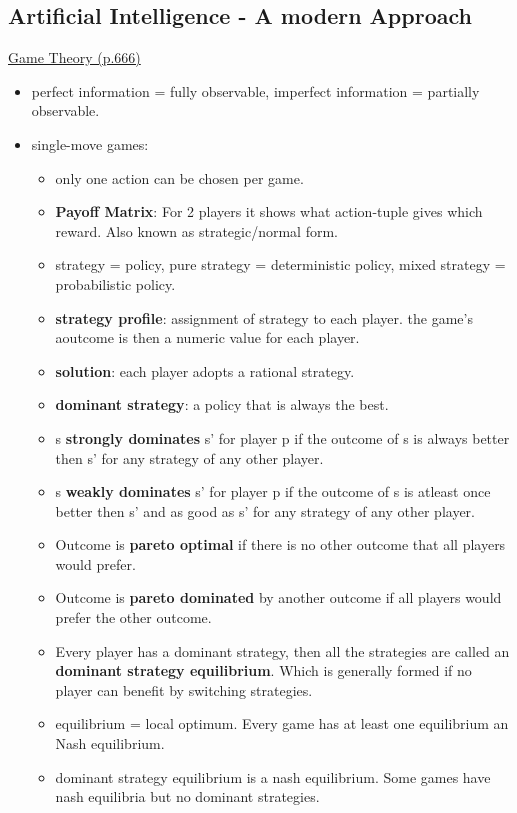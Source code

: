 \subsection{Artificial Intelligence - A modern Approach}
\underline{Game Theory (p.666)}
\begin{itemize}[noitemsep,nolistsep]
	\item perfect information = fully observable, imperfect information = partially observable.
	\item single-move games:
	\begin{itemize}[noitemsep,nolistsep]
		\item only one action can be chosen per game.
		\item \textbf{Payoff Matrix}: For 2 players it shows what action-tuple gives which reward. Also known as strategic/normal form.
		\item strategy = policy, pure strategy = deterministic policy, mixed strategy = probabilistic policy.
		\item \textbf{strategy profile}: assignment of strategy to each player. the game's aoutcome is then a numeric value for each player.
		\item \textbf{solution}: each player adopts a rational strategy.
		\item \textbf{dominant strategy}: a policy that is always the best.
		\item s \textbf{strongly dominates} s' for player p if the outcome of s is always better then s' for any strategy of any other player.
		\item s \textbf{weakly dominates} s' for player p if the outcome of s is atleast once better then s' and as good as s' for any strategy of any other player.
		\item Outcome is \textbf{pareto optimal} if there is no other outcome that all players would prefer.
		\item Outcome is \textbf{pareto dominated} by another outcome if all players would prefer the other outcome.
		\item Every player has a dominant strategy, then all the strategies are called an \textbf{dominant strategy equilibrium}. Which is generally formed if no player can benefit by switching strategies.
		\item equilibrium = local optimum. Every game has at least one equilibrium an Nash equilibrium.
		\item dominant strategy equilibrium is a nash equilibrium. Some games have nash equilibria but no dominant strategies.

\end{itemize}
\end{itemize}
